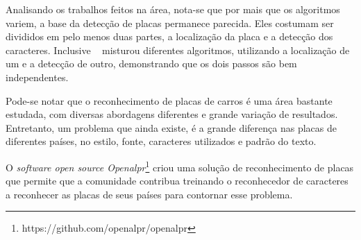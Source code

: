 Analisando os trabalhos feitos na área, nota-se que por mais que os algoritmos variem,
a base da detecção de placas permanece parecida. Eles costumam ser divididos em pelo
menos duas partes, a localização da placa e a detecção dos caracteres. Inclusive
~\cite{ahmad2015automatic} misturou diferentes algoritmos, utilizando a localização
de um e a detecção de outro, demonstrando que os dois passos são bem independentes.

Pode-se notar que o reconhecimento de placas de carros é uma área bastante estudada,
com diversas abordagens diferentes e grande variação de resultados. Entretanto,
um problema que ainda existe, é a grande diferença nas placas de diferentes países,
no estilo, fonte, caracteres utilizados e padrão do texto.

O \emph{software open source Openalpr}\footnote{https://github.com/openalpr/openalpr}
criou uma solução de reconhecimento de placas que permite que a comunidade contribua
treinando o reconhecedor de caracteres a reconhecer as placas de seus países para contornar
esse problema.
